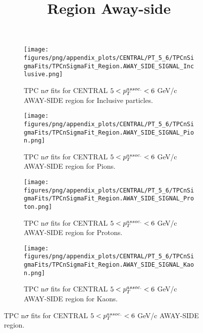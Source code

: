             \begin{figure}[H]
                \title{Region Away-side}
                \begin{subfigure}[b]{0.5\textwidth}
                    \centering
                    \texttt{[image: figures/png/appendix\_plots/CENTRAL/PT\_5\_6/TPCnSigmaFits/TPCnSigmaFit\_Region.AWAY\_SIDE\_SIGNAL\_Inclusive.png]}
                    \caption{TPC n$\sigma$ fits for CENTRAL $5 < \pTassoc < 6$ GeV/c AWAY-SIDE region for Inclusive particles.}
                    \label{fig:appendix_CENTRAL_$5 < \pTassoc < 6$ GeV/c_AWAY_SIDE_SIGNAL_Inclusive}
                \end{subfigure}
                \begin{subfigure}[b]{0.5\textwidth}
                    \centering
                    \texttt{[image: figures/png/appendix\_plots/CENTRAL/PT\_5\_6/TPCnSigmaFits/TPCnSigmaFit\_Region.AWAY\_SIDE\_SIGNAL\_Pion.png]}
                    \caption{TPC n$\sigma$ fits for CENTRAL $5 < \pTassoc < 6$ GeV/c AWAY-SIDE region for Pions.}
                    \label{fig:appendix_CENTRAL_$5 < \pTassoc < 6$ GeV/c_AWAY_SIDE_SIGNAL_Pion}
                \end{subfigure}
                \begin{subfigure}[b]{0.5\textwidth}
                    \centering
                    \texttt{[image: figures/png/appendix\_plots/CENTRAL/PT\_5\_6/TPCnSigmaFits/TPCnSigmaFit\_Region.AWAY\_SIDE\_SIGNAL\_Proton.png]}
                    \caption{TPC n$\sigma$ fits for CENTRAL $5 < \pTassoc < 6$ GeV/c AWAY-SIDE region for Protons.}
                    \label{fig:appendix_CENTRAL_$5 < \pTassoc < 6$ GeV/c_AWAY_SIDE_SIGNAL_Proton}
                \end{subfigure}
                \begin{subfigure}[b]{0.5\textwidth}
                    \centering
                    \texttt{[image: figures/png/appendix\_plots/CENTRAL/PT\_5\_6/TPCnSigmaFits/TPCnSigmaFit\_Region.AWAY\_SIDE\_SIGNAL\_Kaon.png]}
                    \caption{TPC n$\sigma$ fits for CENTRAL $5 < \pTassoc < 6$ GeV/c AWAY-SIDE region for Kaons.}
                    \label{fig:appendix_CENTRAL_$5 < \pTassoc < 6$ GeV/c_AWAY_SIDE_SIGNAL_Kaon}
                \end{subfigure}
                \caption{TPC n$\sigma$ fits for CENTRAL $5 < \pTassoc < 6$ GeV/c AWAY-SIDE region.}
                \label{fig:appendix_CENTRAL_$5 < \pTassoc < 6$ GeV/c_AWAY_SIDE_SIGNAL}
            \end{figure}
